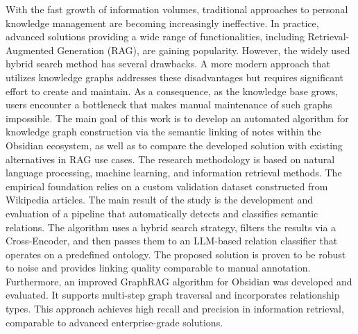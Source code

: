 With the fast growth of information volumes, traditional approaches to personal knowledge management are becoming increasingly ineffective. In practice, advanced solutions providing a wide range of functionalities, including Retrieval-Augmented Generation (RAG), are gaining popularity. However, the widely used hybrid search method has several drawbacks. A more modern approach that utilizes knowledge graphs addresses these disadvantages but requires significant effort to create and maintain. As a consequence, as the knowledge base grows, users encounter a bottleneck that makes manual maintenance of such graphs impossible. The main goal of this work is to develop an automated algorithm for knowledge graph construction via the semantic linking of notes within the Obsidian ecosystem, as well as to compare the developed solution with existing alternatives in RAG use cases. The research methodology is based on natural language processing, machine learning, and information retrieval methods. The empirical foundation relies on a custom validation dataset constructed from Wikipedia articles. The main result of the study is the development and evaluation of a pipeline that automatically detects and classifies semantic relations. The algorithm uses a hybrid search strategy, filters the results via a Cross-Encoder, and then passes them to an LLM-based relation classifier that operates on a predefined ontology. The proposed solution is proven to be robust to noise and provides linking quality comparable to manual annotation. Furthermore, an improved GraphRAG algorithm for Obsidian was developed and evaluated. It supports multi-step graph traversal and incorporates relationship types. This approach achieves high recall and precision in information retrieval, comparable to advanced enterprise-grade solutions.  
